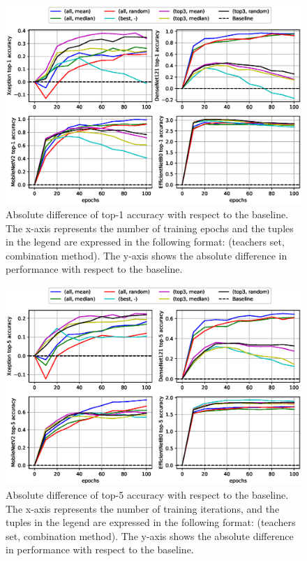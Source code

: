\begin{figure}[h!]
\centering
\includegraphics[width=1\linewidth]{distillation/images/top1_curves}
\caption{Absolute difference of top-1 accuracy with respect to the baseline. The x-axis represents the number of training epochs and the tuples in the legend are expressed in the following format: (teachers set, combination method). The y-axis shows the absolute difference in performance with respect to the baseline.}
\label{fig:top1curves}
\end{figure}


\begin{figure}[h!]
\centering
\includegraphics[width=1\linewidth]{distillation/images/top5_curves}
\caption{Absolute difference of top-5 accuracy with respect to the baseline. The x-axis represents the number of training iterations, and the tuples in the legend are expressed in the following format: (teachers set, combination method). The y-axis shows the absolute difference in performance with respect to the baseline.}
\label{fig:top5curves}
\end{figure}

